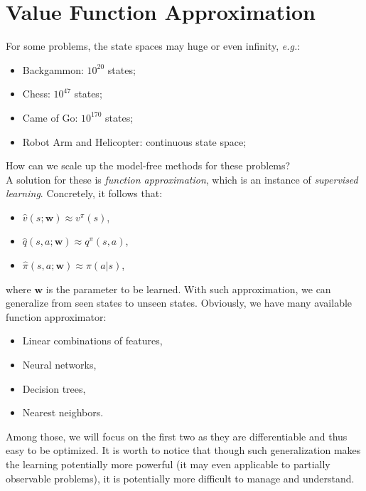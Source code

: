 \documentclass{progartcn}
\begin{document}
\begin{comment}
			By the update rule, we know the $\mu$ can not be zero when $\pi$ is non-zero. It should be noticed that importance sampling can dramatically increase the variance.

			\textbf{Importance Sampling for Off-Policy TD}: \textit{Weight TD target $R+\gamma V(S')$ by importance sampling, then we only need a single importance sampling correction to update the value}
			\[V(S_t)\gets V(S_t)+\alpha\left(\frac{\pi(A_t|S_t)}{\mu(A_t|S_t)}(R_{t+1}+\gamma V(S_{t+1}))-V(S_t)\right).\]
			\end{comment}

\pagebreak

\section{Value Function Approximation}
	\label{sec: value function approximation}

	For some problems, the state spaces may huge or even infinity, \textit{e.g.}:
		\begin{itemize}[noitemsep,topsep=0pt]
			\item Backgammon: $10^{20}$ states;
			\item Chess: $10^{47}$ states;
			\item Came of Go: $10^{170}$ states;
			\item Robot Arm and Helicopter: continuous state space;
		\end{itemize}
	
	How can we scale up the model-free methods for these problems?\\

	A solution for these is \textit{function approximation}, which is an instance of \textit{supervised learning}. Concretely, it follows that:
		\begin{itemize}[noitemsep,topsep=0pt]
			\item $\hat v(s;\bm{w})\approx v^\pi(s)$,
			\item $\hat q(s,a;\bm{w})\approx q^\pi(s,a)$,
			\item $\hat \pi(s,a;\bm{w})\approx \pi(a|s)$,
		\end{itemize}
	where $\bm{w}$ is the parameter to be learned. With such approximation, we can generalize from seen states to unseen states. Obviously, we have many available function approximator:
		\begin{itemize}[noitemsep,topsep=0pt]
			\item Linear combinations of features,
			\item Neural networks,
			\item Decision trees,
			\item Nearest neighbors.
		\end{itemize}
	Among those, we will focus on the first two as they are differentiable and thus easy to be optimized. It is worth to notice that though such generalization makes the learning potentially more powerful (it may even applicable to partially observable problems), it is potentially more difficult to manage and understand.\\
\end{document}
